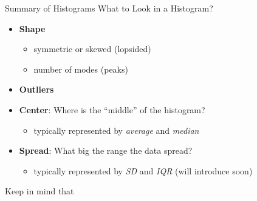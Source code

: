 \documentclass[
  ignorenonframetext,
]{beamer}
\providecommand{\tightlist}{%
  \setlength{\itemsep}{0pt}\setlength{\parskip}{0pt}}
\begin{document}
\begin{frame}{Summary of Histograms}
\protect\hypertarget{summary-of-histograms}{}
What to Look in a Histogram?

\begin{itemize}
\item
  \textbf{Shape}

  \begin{itemize}
  \tightlist
  \item
    symmetric or skewed (lopsided)
  \item
    number of modes (peaks)
  \end{itemize}
\item
  \textbf{Outliers}
\item
  \textbf{Center}: Where is the ``middle'' of the histogram?

  \begin{itemize}
  \tightlist
  \item
    typically represented by \emph{average} and \emph{median}
  \end{itemize}
\item
  \textbf{Spread}: What big the range the data spread?

  \begin{itemize}
  \tightlist
  \item
    typically represented by \emph{SD} and \emph{IQR} (will introduce
    soon)
  \end{itemize}
\end{itemize}

Keep in mind that

\begin{center}
\end{center}
\end{frame}
\end{document}
